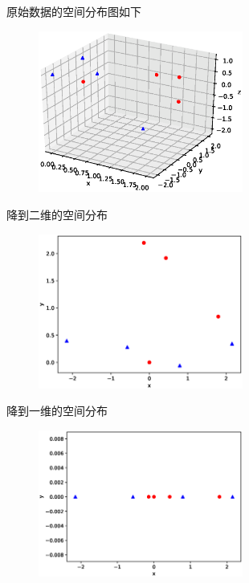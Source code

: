 \documentclass[12pt,a4paper]{article}
\begin{document}
原始数据的空间分布图如下
\begin{figure}[H]
	\centering
	\includegraphics[width = 0.6\textwidth,height=0.3\textheight]{raw}
\end{figure} 
降到二维的空间分布
\begin{figure}[H]
	\centering
	\includegraphics[width = 0.6\textwidth,height=0.3\textheight]{two}
\end{figure} 
降到一维的空间分布
\begin{figure}[H]
	\centering
	\includegraphics[width = 0.6\textwidth,height=0.3\textheight]{one}
\end{figure} 
\end{document}
